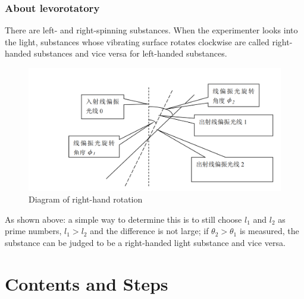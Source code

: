 \documentclass[UTF8]{article}
\begin{document}
	\subsubsection{About levorotatory}
	There are left- and right-spinning substances. When the experimenter looks into the light, substances whose vibrating surface rotates clockwise are called right-handed substances and vice versa for left-handed substances.
	  \begin{figure}[H]
		\centering
		\includegraphics[clip,scale=0.5,trim={30 0 0 20}]{figure/fig8.png}
		\caption{Diagram of right-hand rotation}
		\label{figure.7}
	\end{figure}

	As shown above: a simple way to determine this is to still choose $l_{1} $ and $l_{2} $ as prime numbers, $l_{1} > l_{2} $ and the difference 
	is not large; if $\theta _{2} > \theta _{1} $ is measured, the substance can be judged to be a right-handed light substance and vice versa.
	
	\section{Contents and Steps}
	
\end{document}
